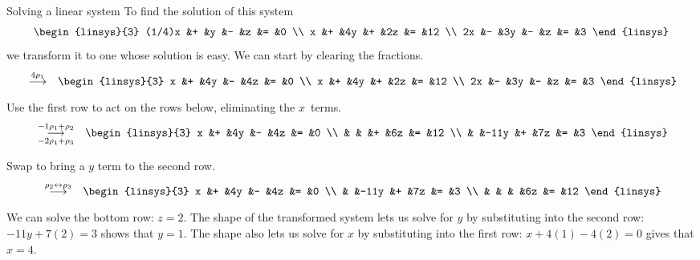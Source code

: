 \documentclass[10pt,t,serif,professionalfont]{beamer}
\begin{document}
\begin{frame}{Solving a linear system}
\ex 
To find the solution of this system
\begin{equation*}
  \begin{linsys}{3}
   (1/4)x  &+  &y  &-  &z  &=  &0  \\
        x  &+  &4y &+  &2z &=  &12  \\
       2x  &-  &3y &-  &z  &=  &3  
  \end{linsys}  
\end{equation*}
we transform it to one whose solution is easy.
\pause We can start by clearing the fractions.
\begin{eqnarray*}
  &\grstep{4\rho_1}
  &\begin{linsys}{3}
        x  &+  &4y &-  &4z  &=  &0  \\
        x  &+  &4y &+  &2z &=  &12  \\
       2x  &-  &3y &-  &z  &=  &3  
  \end{linsys}  
\end{eqnarray*}
\pause Use the first row to act on the rows below, eliminating the $x$~terms.
\begin{eqnarray*}
  &\grstep[-2\rho_1+\rho_3]{-1\rho_1+\rho_2}
  &\begin{linsys}{3}
        x  &+  &4y   &-  &4z  &=  &0  \\
           &   &     &+  &6z  &=  &12  \\
           &   &-11y &+  &7z  &=  &3  
  \end{linsys} 
\end{eqnarray*} 
\end{frame}\begin{frame}
Swap to bring a $y$ term to the second row.
\begin{eqnarray*}
  &\grstep{\rho_2\leftrightarrow\rho_3}
  &\begin{linsys}{3}
        x  &+  &4y   &-  &4z  &=  &0  \\
           &   &-11y &+  &7z  &=  &3  \\
           &   &     &   &6z  &=  &12  
  \end{linsys}  
\end{eqnarray*}
\pause We can solve the bottom row:
$z=2$.
\pause
The shape of the transformed system 
lets us solve for $y$ by substituting into the second row:
$-11y+7(2)=3$ shows that $y=1$.
\pause
The shape also lets us solve for $x$ by substituting into the
first row: $x+4(1)-4(2)=0$ gives that $x=4$. 

\df[df:EchelonForm]
\end{frame}
\end{document}
